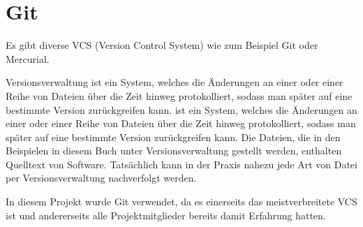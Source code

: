 \renewcommand{\kapitelautor}{Autor: Felix Zwickelstorfer}

\section{Git}\label{sec:git}

Es gibt diverse VCS (Version Control System) wie zum Beispiel Git oder Mercurial.
\begin{coolQuote}
 Versionsverwaltung ist ein System, welches die Änderungen an einer oder einer Reihe von Dateien über die Zeit hinweg protokolliert, sodass man später auf eine bestimmte Version zurückgreifen kann.
 ist ein System, welches die Änderungen an einer oder einer Reihe von Dateien über die Zeit hinweg protokolliert, sodass man später auf eine bestimmte Version zurückgreifen kann.
Die Dateien, die in den Beispielen in diesem Buch unter Versionsverwaltung gestellt werden, enthalten Quelltext von Software.
Tatsächlich kann in der Praxis nahezu jede Art von Datei per Versionsverwaltung nachverfolgt werden.
\end{coolQuote}

In diesem Projekt wurde Git verwendet, da es einerseits das meistverbreitete VCS ist und andererseits alle Projektmitglieder bereits damit Erfahrung hatten.

\vfill
\pagebreak




